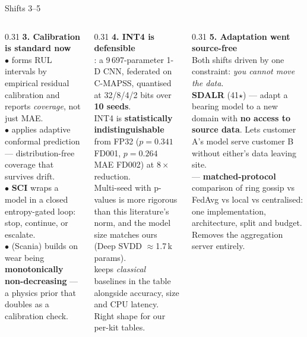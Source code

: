 \documentclass[aspectratio=169,10pt]{beamer}
\begin{document}
\begin{frame}{Shifts 3--5}
  \small
  \begin{columns}[T]
    \begin{column}{0.31\textwidth}
      \textbf{3. Calibration is standard now}
      \\[1.5mm]
      \scriptsize
      $\bullet$  forms RUL intervals by empirical residual
      calibration and reports \emph{coverage}, not just MAE.\\[1mm]
      $\bullet$  applies adaptive conformal prediction ---
      distribution-free coverage that survives drift.\\[1mm]
      $\bullet$  \textbf{SCI} wraps a model in a closed
      entropy-gated loop: stop, continue, or escalate.\\[1mm]
      $\bullet$  (Scania) builds on wear being
      \textbf{monotonically non-decreasing} --- a physics prior that doubles as
      a calibration check.
    \end{column}
    \begin{column}{0.31\textwidth}
      \textbf{4. INT4 is defensible}
      \\[1.5mm]
      \scriptsize
      : a 9\,697-parameter 1-D CNN, federated on C-MAPSS,
      quantised at 32/8/4/2 bits over \textbf{10 seeds}.
      \\[1.5mm]
      INT4 is \textbf{statistically indistinguishable} from FP32
      ($p=0.341$ FD001, $p=0.264$ MAE FD002) at $8\times$ reduction.
      \\[1.5mm]
      Multi-seed with p-values is more rigorous than this literature's norm,
      and the model size matches ours (Deep SVDD $\approx$1.7\,k params).
      \\[1.5mm]
       keeps \emph{classical} baselines in the table alongside
      accuracy, size and CPU latency. Right shape for our per-kit tables.
    \end{column}
    \begin{column}{0.31\textwidth}
      \textbf{5. Adaptation went source-free}
      \\[1.5mm]
      \scriptsize
      Both shifts driven by one constraint: \emph{you cannot move the data}.
      \\[1.5mm]
       \textbf{SDALR} (41$\star$) --- adapt a bearing model to a
      new domain with \textbf{no access to source data}. Lets customer A's model
      serve customer B without either's data leaving site.
      \\[1.5mm]
       --- \textbf{matched-protocol} comparison of ring gossip
      vs FedAvg vs local vs centralised: one implementation, architecture,
      split and budget. Removes the aggregation server entirely.
    \end{column}
  \end{columns}
\end{frame}
\end{document}
